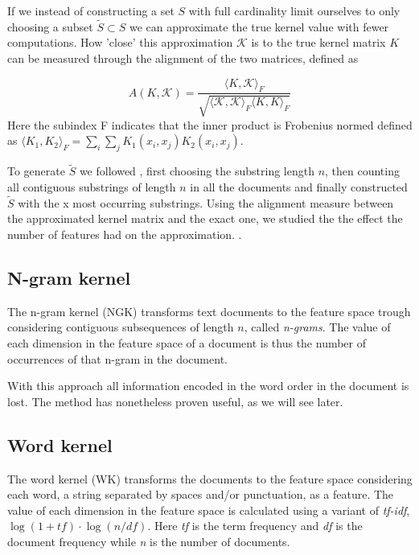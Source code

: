 If we instead of constructing a set $ S $ with full cardinality limit ourselves to only choosing a subset $ \tilde{S} \subset S $ we can approximate the true kernel value with fewer computations. How 'close' this approximation $ \mathcal{K} $ is to the true kernel matrix $ K $ can be measured through the alignment of the two matrices, defined as

\begin{equation}\label{key}
A(K,\mathcal{K}) = \dfrac{\langle K, \mathcal{K}\rangle_{F}}{\sqrt{\langle \mathcal{K}, \mathcal{K}\rangle_{F} \langle K, K\rangle_{F} }}
\end{equation}
Here the subindex F indicates that the inner product is Frobenius normed defined as $ \langle K_1,K_2 \rangle_{F} = \sum_{i}\sum_{j}K_1(x_i,x_j)K_2(x_i,x_j) $.

To generate $ \tilde{S} $ we followed \cite{lodhi}, first choosing the substring length $ n $, then counting all contiguous substrings of length $ n $ in all the documents and finally constructed $ \tilde{S} $ with the x most occurring substrings. Using the alignment measure between the approximated kernel matrix and the exact one, we studied the the effect the number of features had on the approximation. 
. 
\subsection{N-gram kernel}
The n-gram kernel (NGK) transforms text documents to the feature space trough  considering contiguous subsequences of length $ n $, called \textit{n-grams}. The value of each dimension in the feature space of a document is thus the number of occurrences of that n-gram in the document. 

With this approach all information encoded in the word order in the document is lost. The method has nonetheless proven useful, as we will see later.

\subsection{Word kernel}
The word kernel (WK) transforms the documents to the feature space considering each word, a string separated by spaces and/or punctuation, as a feature. The value of each dimension in the feature space is calculated using a variant of \textit{tf-idf}, $ \log(1+tf) \cdot \log(n/df) $. Here \textit{tf} is the term frequency and \textit{df} is the document frequency while \textit{n} is the number of documents. 

